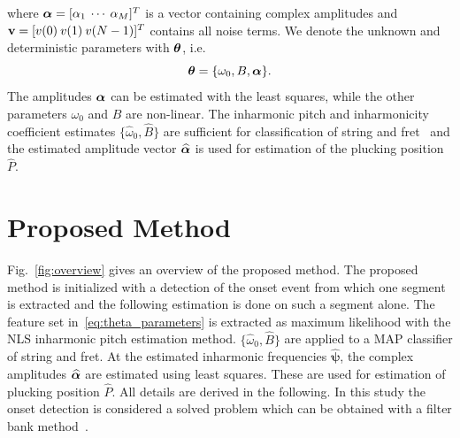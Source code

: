 \documentclass{article}
\begin{document}
where $\text{\boldmath$\alpha$} = [\alpha_1 \: \cdots \: \alpha_M]^T$ is a vector containing complex amplitudes and $\mathbf v = [v(0) \: v(1) \: v(N-1)]^T$ contains all noise terms. We denote the unknown and deterministic parameters with $\text{\boldmath$\theta$}$, i.e.
\begin{equation}\label{eq:theta_parameters}
  \text{\boldmath$\theta$} = \{\omega_0, B, \text{\boldmath$\alpha$}\}.
\end{equation}
The amplitudes $\text{\boldmath$\alpha$}$ can be estimated with the least squares, while the other parameters $\omega_0$ and $B$ are non-linear. 
The inharmonic pitch and inharmonicity coefficient estimates $\{\widehat\omega_0, \widehat B \} $ are sufficient for classification of string and fret~\cite{barbancho:inharmonicity_tablature,michelson2018_aes} and the estimated amplitude vector $\text{\boldmath${\widehat\alpha}$}$ is used for estimation of the plucking position $\widehat{P}$.%
%     
%
%
%
%
%
\section{Proposed Method} %
\label{sec:proposed_method}
\vspace{-.6mm}
Fig.~\ref{fig:overview} gives an overview of the proposed method. The proposed method is initialized with a detection of the onset event from which one segment is extracted and the following estimation is done on such a segment alone. The feature set in~\eqref{eq:theta_parameters} is extracted as maximum likelihood with the NLS inharmonic pitch estimation method. $\{\widehat\omega_0, \widehat B \} $ are applied to a MAP classifier of string and fret. At the estimated inharmonic frequencies $\widehat{\boldsymbol{\psi}}$, the complex amplitudes $\text{\boldmath${\widehat\alpha}$}$ are estimated using least squares. These are used for estimation of plucking position $\widehat{P}$. All details are derived in the following.
In this study the onset detection is considered a solved problem which can be obtained with a filter bank method~\cite{olivier:mirtoolbox_dafx}.%
%
%
%
%
\end{document}
